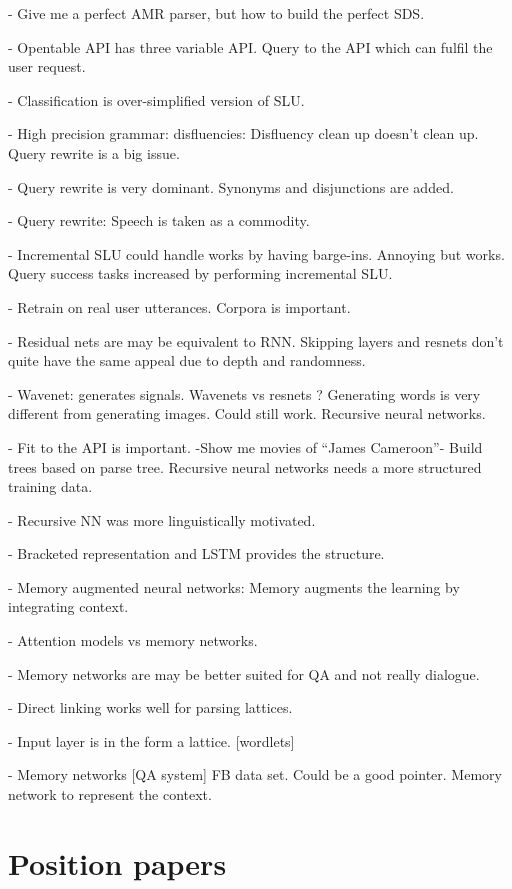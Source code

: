 \documentclass[12pt]{article}
\begin{document}
- Give me a perfect AMR parser, but how to build the perfect SDS.

- Opentable API has three variable API. Query to the API which can fulfil the user request.

- Classification is over-simplified version of SLU.

- High precision grammar: disfluencies: Disfluency clean up doesn’t clean up. Query rewrite is a big issue.

- Query rewrite is very dominant. Synonyms and disjunctions are added.

- Query rewrite: Speech is taken as a commodity.

- Incremental SLU could handle works by having barge-ins. Annoying but works. Query success tasks increased by performing incremental SLU.

- Retrain on real user utterances. Corpora is important.

- Residual nets are may be equivalent to RNN. Skipping layers and resnets don’t quite have the same appeal due to depth and randomness.

- Wavenet: generates signals. Wavenets vs resnets ? Generating words is very different from generating images. Could still work. Recursive neural networks.

- Fit to the API is important. -Show me movies of “James Cameroon”- Build trees based on parse tree. Recursive neural networks needs a more structured training data.

- Recursive NN was more linguistically motivated.

- Bracketed representation and LSTM provides the structure.

- Memory augmented neural networks: Memory augments the learning by integrating context.

- Attention models vs memory networks.

- Memory networks are may be better suited for QA and not really dialogue.

- Direct linking works well for parsing lattices.

- Input layer is in the form a lattice. [wordlets]

- Memory networks [QA system] FB data set. Could be a good pointer. Memory network to represent the context.


\section{Position papers}
\end{document}
